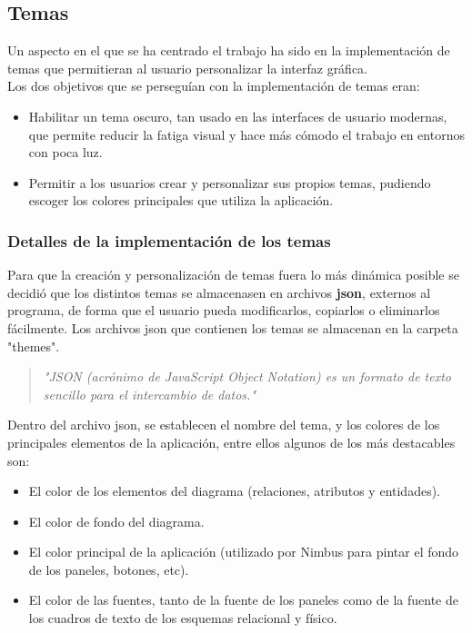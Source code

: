 \subsection{Temas}
Un aspecto en el que se ha centrado el trabajo ha sido en la implementación de temas que permitieran al usuario personalizar la interfaz gráfica.\\

Los dos objetivos que se perseguían con la implementación de temas eran:
\begin{itemize}
    \item Habilitar un tema oscuro, tan usado en las interfaces de usuario modernas, que permite reducir la fatiga visual y hace más cómodo el trabajo en entornos con poca luz.
    \item Permitir a los usuarios crear y personalizar sus propios temas, pudiendo escoger los colores principales que utiliza la aplicación.
\end{itemize}
\subsubsection{Detalles de la implementación de los temas}
Para que la creación y personalización de temas fuera lo más dinámica posible se decidió que los distintos temas se almacenasen en archivos \textbf{json}\cite{json}, externos al programa, de forma que el usuario pueda modificarlos, copiarlos o eliminarlos fácilmente. Los archivos json que contienen los temas se almacenan en la carpeta "themes".\\

\begin{quote}
\textit{"JSON (acrónimo de JavaScript Object Notation) es un formato de texto sencillo para el intercambio de datos."}
\end{quote}

Dentro del archivo json, se establecen el nombre del tema, y los colores de los principales elementos de la aplicación, entre ellos algunos de los más destacables son:
\begin{itemize}
    \item El color de los elementos del diagrama (relaciones, atributos y entidades).
    \item El color de fondo del diagrama.
    \item El color principal de la aplicación (utilizado por Nimbus para pintar el fondo de los paneles, botones, etc).
    \item El color de las fuentes, tanto de la fuente de los paneles como de la fuente de los cuadros de texto de los esquemas relacional y físico.
\end{itemize}

